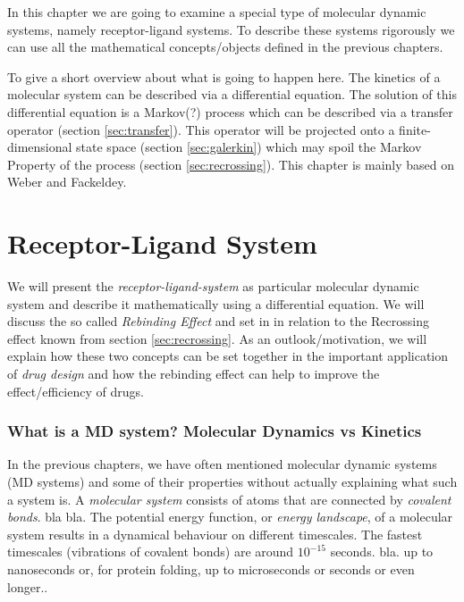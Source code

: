 In this chapter we are going to examine a special type of molecular dynamic systems, namely receptor-ligand systems.
To describe these systems rigorously we can use all the mathematical concepts/objects defined in the previous chapters.

To give a short overview about what is going to happen here. The kinetics of a molecular system can be described via a differential equation. The solution of this  differential equation is a Markov(?) process which can be described via a transfer operator (section \ref{sec:transfer}). This operator will be projected onto a finite-dimensional state space (section \ref{sec:galerkin}) which may spoil the Markov Property of the process (section \ref{sec:recrossing}). 
This chapter is mainly based on Weber and Fackeldey\cite{weber2014}.



\section{Receptor-Ligand System}

We will present the \textit{receptor-ligand-system} as particular molecular dynamic system and describe it mathematically using a differential equation.
We will discuss the so called \textit{Rebinding Effect} and set in in relation to the Recrossing effect known from section \ref{sec:recrossing}.
As an outlook/motivation, we will explain how these two concepts can be set together in the important application of \textit{drug design} and how the rebinding effect can help to improve the effect/efficiency of drugs.

\subsubsection*{What is a MD system? Molecular Dynamics vs Kinetics} 
In the previous chapters, we have often mentioned molecular dynamic systems (MD systems) and some of their properties without actually explaining what such a system is.
A \textit{molecular system} consists of atoms that are connected by \textit{covalent bonds}. bla bla.
The potential energy function, or \textit{energy landscape}, of a molecular system results in a dynamical behaviour on different timescales.
The fastest timescales (vibrations of covalent bonds) are around $10^{-15}$ seconds. 
bla. up to nanoseconds or, for protein folding, up to microseconds or seconds or even longer..

